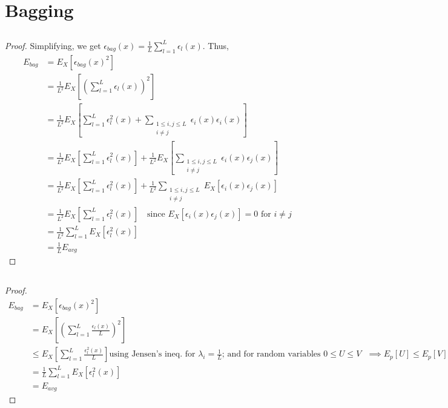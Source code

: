 \documentclass{article}
\begin{document}
\newpage


\section{Bagging}
\subsection{}
\begin{proof}
	
Simplifying, we get $\epsilon_{bag}(x) = \frac{1}{L}\sum\limits_{l=1}^L \epsilon_l(x)$. Thus,
\begin{equation}
  \label{eq:1.2}
  \begin{split}
	  E_{bag} &= E_X\left[\epsilon_{bag}(x)^2\right] \\
	          &= \frac{1}{L^2}E_X\left[\left(\sum_{l=1}^L \epsilon_l(x)\right)^2\right] \\
			  &= \frac{1}{L^2}E_X\left[\sum_{l=1}^L \epsilon_l^2(x) + \sum_{\substack{1\leq i,j\leq L \\ i \neq j}}\epsilon_i(x)\epsilon_i(x) \right] \\
			  &= \frac{1}{L^2}E_X\left[\sum_{l=1}^L \epsilon_l^2(x)\right]+ \frac{1}{L^2}E_X\left[\sum_{\substack{1\leq i,j\leq L \\ i \neq j}}\epsilon_i(x)\epsilon_j(x) \right] \\
			  &= \frac{1}{L^2}E_X\left[\sum_{l=1}^L \epsilon_l^2(x)\right]+ \frac{1}{L^2}\sum_{\substack{1\leq i,j\leq L \\ i \neq j}}E_X\left[\epsilon_i(x)\epsilon_j(x) \right] \\
			  &= \frac{1}{L^2}E_X\left[\sum_{l=1}^L \epsilon_l^2(x)\right] \quad \text{since $E_X\left[\epsilon_i(x)\epsilon_j(x)\right]=0$ for $i \neq j$} \\
			  &= \frac{1}{L^2} \sum_{l=1}^L E_X\left[ \epsilon_l^2(x)\right] \\
			  &= \frac{1}{L}E_{avg}
  \end{split}
\end{equation}
\end{proof}


\subsection{}
\begin{proof}
\begin{equation}
  \label{eq:1.3}
  \begin{split}
	  E_{bag} &= E_X\left[\epsilon_{bag}(x)^2\right] \\
	          &= E_X\left[\left(\sum_{l=1}^L \frac{\epsilon_l(x)}{L}\right)^2\right] \\
			  &\leq E_X\left[\sum_{l=1}^L \frac{\epsilon_l^2(x)}{L}\right] \text{using Jensen's ineq. for $\lambda_i = \frac{1}{L}$; and for random variables $0\leq U\leq V$ $\implies E_p[U] \leq E_p[V]$ } \\
			  &= \frac{1}{L}\sum_{l=1}^L E_X\left[ \epsilon_l^2(x)\right] \\
			  &= E_{avg}
  \end{split}
\end{equation}
\end{proof}
\end{document}
